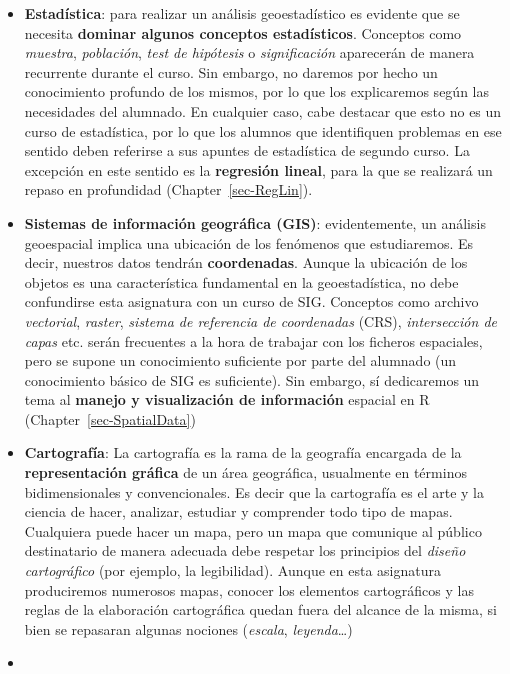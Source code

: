 \documentclass[
  letterpaper,
  DIV=11,
  numbers=noendperiod]{scrreprt}
\begin{document}
\begin{itemize}
\item
  \textbf{Estadística}: para realizar un análisis geoestadístico es
  evidente que se necesita \textbf{dominar algunos conceptos
  estadísticos}. Conceptos como \emph{muestra}, \emph{población},
  \emph{test de hipótesis} o \emph{significación} aparecerán de manera
  recurrente durante el curso. Sin embargo, no daremos por hecho un
  conocimiento profundo de los mismos, por lo que los explicaremos según
  las necesidades del alumnado. En cualquier caso, cabe destacar que
  esto no es un curso de estadística, por lo que los alumnos que
  identifiquen problemas en ese sentido deben referirse a sus apuntes de
  estadística de segundo curso. La excepción en este sentido es la
  \textbf{regresión lineal}, para la que se realizará un repaso en
  profundidad (Chapter~\ref{sec-RegLin}).
\item
  \textbf{Sistemas de información geográfica (GIS)}: evidentemente, un
  análisis geoespacial implica una ubicación de los fenómenos que
  estudiaremos. Es decir, nuestros datos tendrán \textbf{coordenadas}.
  Aunque la ubicación de los objetos es una característica fundamental
  en la geoestadística, no debe confundirse esta asignatura con un curso
  de SIG. Conceptos como archivo \emph{vectorial}, \emph{raster},
  \emph{sistema de referencia de coordenadas} (CRS), \emph{intersección
  de capas} etc. serán frecuentes a la hora de trabajar con los ficheros
  espaciales, pero se supone un conocimiento suficiente por parte del
  alumnado (un conocimiento básico de SIG es suficiente). Sin embargo,
  sí dedicaremos un tema al \textbf{manejo y visualización de
  información} espacial en R (Chapter~\ref{sec-SpatialData})
\item
  \textbf{Cartografía}: La cartografía es la rama de la geografía
  encargada de la \textbf{representación gráfica} de un área geográfica,
  usualmente en términos bidimensionales y convencionales. Es decir que
  la cartografía es el arte y la ciencia de hacer, analizar, estudiar y
  comprender todo tipo de mapas. Cualquiera puede hacer un mapa, pero un
  mapa que comunique al público destinatario de manera adecuada debe
  respetar los principios del \emph{diseño cartográfico} (por ejemplo,
  la legibilidad). Aunque en esta asignatura produciremos numerosos
  mapas, conocer los elementos cartográficos y las reglas de la
  elaboración cartográfica quedan fuera del alcance de la misma, si bien
  se repasaran algunas nociones (\emph{escala}, \emph{leyenda}\ldots)
\item

\end{itemize}
\end{document}

